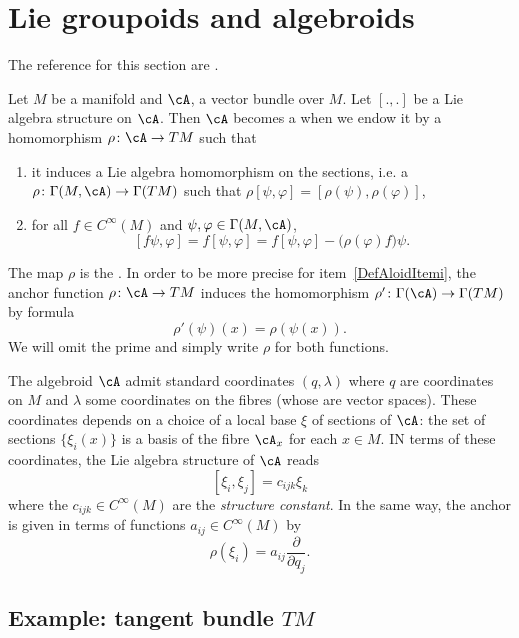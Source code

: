 \section{Lie groupoids and algebroids}
The reference for this section are \cite{WeinGroupoids,WeinGpoidsSymple}.

Let $M$ be a manifold and $\cA$, a vector bundle over $M$. Let $[.,.]$ be a Lie algebra structure on $\cA$. Then $\cA$ becomes a  when we endow it by a homomorphism $\rho\colon \cA\to TM$ such that
\begin{enumerate}
	\item\label{DefAloidItemi} it induces a Lie algebra homomorphism on the sections, i.e. a $\rho\colon \Gamma(M,\cA)\to \Gamma(TM)$ such that $\rho[\psi,\varphi]=[\rho(\psi),\rho(\varphi)]$,
	\item for all $f\in C^{\infty}(M)$ and $\psi,\varphi\in\Gamma(M,\cA)$,
	      \begin{equation}  \label{DefAlgoidCondc}
		      [f\psi,\varphi]=f[\psi,\varphi]=f[\psi,\varphi]-\big( \rho(\varphi)f \big)\psi.
	      \end{equation}

\end{enumerate}
The map $\rho$ is the . In order to be more precise for item~\ref{DefAloidItemi}, the anchor function $\rho\colon \cA\to TM$ induces the homomorphism  $\rho'\colon \Gamma(\cA)\to \Gamma(TM)$ by formula
\begin{equation}  \label{EqInduitAncra}
	\rho'(\psi)(x)=\rho(\psi(x)).
\end{equation}
We will omit the prime and simply write $\rho$ for both functions.

The algebroid $\cA$ admit standard coordinates\label{PgStandCoord} $(q,\lambda)$ where $q$ are coordinates on $M$ and $\lambda$ some coordinates on the fibres (whose are vector spaces). These coordinates depends on a choice of a local base $\xi$ of sections of $\cA$: the set of sections $\{\xi_{i}(x)\}$ is a basis of the fibre $\cA_{x}$ for each $x\in M$. IN terms of these coordinates, the Lie algebra structure of $\cA$ reads
\[
	[\xi_{i},\xi_{j}]=c_{ijk}\xi_{k}
\]
where the $c_{ijk}\in C^{\infty}(M)$ are the \emph{structure constant}. In the same way, the anchor is given in terms of functions $a_{ij}\in C^{\infty}(M)$ by
\[
	\rho(\xi_{i})=a_{ij}\frac{ \partial }{ \partial q_{j} }.
\]

\subsection{Example: tangent bundle \texorpdfstring{$TM$}{TM}}


